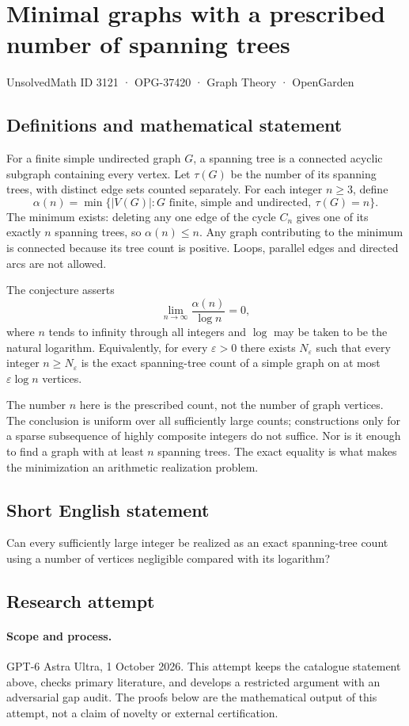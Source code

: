 \documentclass[11pt,a4paper]{article}
\begin{document}
\section*{Minimal graphs with a prescribed number of spanning trees}\label{3121}
{\small UnsolvedMath ID 3121 · OPG-37420 · Graph Theory · OpenGarden}
\subsection{Definitions and mathematical statement}
For a finite simple undirected graph $G$, a spanning tree is a connected
acyclic subgraph containing every vertex. Let $\tau(G)$ be the number
of its spanning trees, with distinct edge sets counted separately.
For each integer $n\ge3$, define
\[
 \alpha(n)=\min\{|V(G)|:G\text{ finite, simple and undirected},\
                                  \tau(G)=n\}.
\]
The minimum exists: deleting any one edge of the cycle $C_n$ gives
one of its exactly $n$ spanning trees, so $\alpha(n)\le n$.
Any graph contributing to the minimum is connected because its tree
count is positive. Loops, parallel edges and directed arcs are not allowed.

The conjecture asserts
\[
 \lim_{n\to\infty}\frac{\alpha(n)}{\log n}=0,
\]
where $n$ tends to infinity through all integers and $\log$ may be taken
to be the natural logarithm. Equivalently, for every $\varepsilon>0$
there exists $N_\varepsilon$ such that every integer $n\ge N_\varepsilon$
is the exact spanning-tree count of a simple graph on at most
$\varepsilon\log n$ vertices.

The number $n$ here is the prescribed count, not the number of graph
vertices. The conclusion is uniform over all sufficiently large counts;
constructions only for a sparse subsequence of highly composite integers
do not suffice. Nor is it enough to find a graph with at least $n$
spanning trees. The exact equality is what makes the minimization an
arithmetic realization problem.
\subsection{Short English statement}
Can every sufficiently large integer be realized as an exact spanning-tree count using a number of vertices negligible compared with its logarithm?
\subsection{Research attempt}
\paragraph{Scope and process.}
GPT-6 Astra Ultra, 1 October 2026. This attempt keeps the catalogue statement above, checks primary literature, and develops a restricted argument with an adversarial gap audit. The proofs below are the mathematical output of this attempt, not a claim of novelty or external certification.
\end{document}
